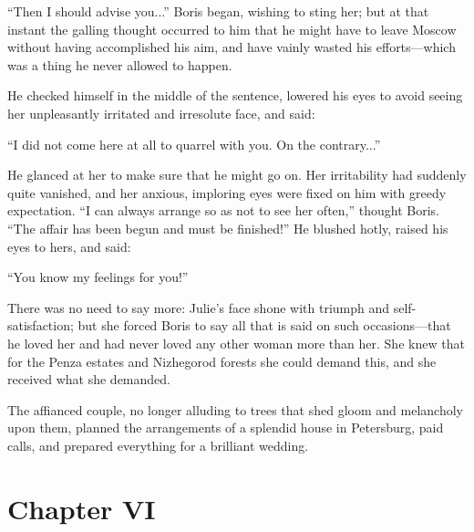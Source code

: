 ``Then I should advise you...'' Boris began, wishing to sting
her; but at that instant the galling thought occurred to him that
he might have to leave Moscow without having accomplished his
aim, and have vainly wasted his efforts---which was a thing he
never allowed to happen.

He checked himself in the middle of the sentence, lowered his
eyes to avoid seeing her unpleasantly irritated and irresolute
face, and said:

``I did not come here at all to quarrel with you. On the
contrary...''

He glanced at her to make sure that he might go on. Her
irritability had suddenly quite vanished, and her anxious,
imploring eyes were fixed on him with greedy expectation. ``I can
always arrange so as not to see her often,'' thought Boris. ``The
affair has been begun and must be finished!''  He blushed hotly,
raised his eyes to hers, and said:

``You know my feelings for you!''

There was no need to say more: Julie's face shone with triumph
and self-satisfaction; but she forced Boris to say all that is
said on such occasions---that he loved her and had never loved
any other woman more than her. She knew that for the Penza
estates and Nizhegorod forests she could demand this, and she
received what she demanded.

The affianced couple, no longer alluding to trees that shed gloom
and melancholy upon them, planned the arrangements of a splendid
house in Petersburg, paid calls, and prepared everything for a
brilliant wedding.


\chapter*{Chapter VI}
\ifaudio     
{} 
\fi

